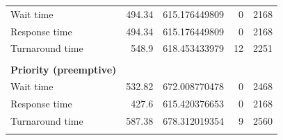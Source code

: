 \documentclass[12pt,letterpaper]{article}
\begin{document}
\begin{appendices}
\begin{table}[H]
\begin{tabular}{l r r r r}
					\hline
					Wait time &		494.34 &	615.176449809 &	0 &	2168  	\\
Response time &		494.34 &	615.176449809 &	0 &	2168 	\\
Turnaround time &	548.9 &	618.453433979 &	12 &	2251 	\\
					\\
					\textbf{Priority (preemptive)} \\
					\hline
					Wait time &		532.82 &	672.008770478 &	0 &	2468 	\\
Response time &		427.6 &	615.420376653 &	0 &	2168 	\\
Turnaround time &	587.38 &	678.312019354 &	9 &	2560 	\\
					\\
				\end{tabular}
	 			\label{table:data-rand4}
			\end{table}


\end{appendices}
\end{document}
